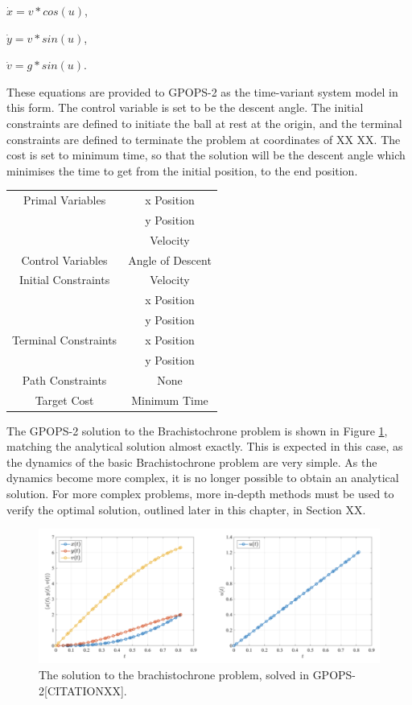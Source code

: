 $\dot{x} = v*cos(u)$,

$\dot{y} = v*sin(u)$,

$\dot{v} = g*sin(u)$.

\noindent These equations are provided to GPOPS-2 as the time-variant system model in this form. The control variable is set to be the descent angle. The initial constraints are defined to initiate the ball at rest at the origin, and the terminal constraints are defined to terminate the problem at coordinates of XX XX. The cost is set to minimum time, so that the solution will be the descent angle which minimises the time to get from the initial position, to the end position. 

\begin{table}
\centering
\begin{tabular}{|c|c|}
	\hline Primal Variables  & x Position\\& y Position\\& Velocity\\ 
	\hline Control Variables  & Angle of Descent\\ 
	\hline Initial Constraints  & Velocity\\ & x Position\\ & y Position\\
	\hline Terminal Constraints &  x Position\\ & y Position\\
	\hline Path Constraints & None \\ 
	\hline Target Cost & Minimum Time \\ 
	\hline 
\end{tabular} 
\end{table}


The GPOPS-2 solution to the Brachistochrone problem is shown in Figure \ref{fig:Brachistochrone}, matching the analytical solution almost exactly. This is expected in this case, as the dynamics of the basic Brachistochrone problem are very simple. As the dynamics become more complex, it is no longer possible to obtain an analytical solution. For more complex problems, more in-depth methods must be used to verify the optimal solution, outlined later in this chapter, in Section XX.  

\begin{figure}[ht]
\centering
\includegraphics[width=0.9\linewidth]{figures/4_LODESTAR/Brachistochrone}
\caption{The solution to the brachistochrone problem, solved in GPOPS-2[CITATIONXX].}
\label{fig:Brachistochrone}
\end{figure}





